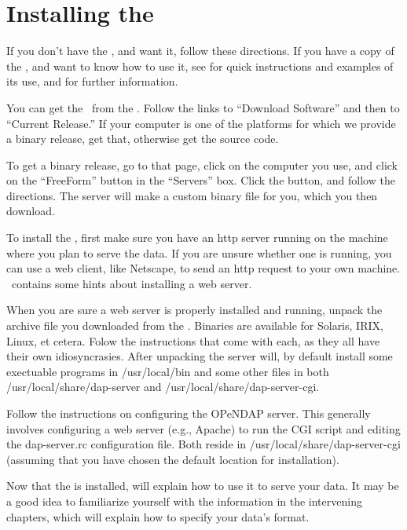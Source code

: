 \section{Installing the \ffs}
\label{ff,install-dods}

If you don't have the \ffs , and want it, follow these directions.  If
you have a copy of the \ffs , and want to know how to use it, see
 for quick instructions and examples of its use, and
 for further information.

You can get the \ffs\ from the \DODShome . Follow the links to
``Download Software'' and then to ``Current Release.''  If your
computer is one of the platforms for which we provide a binary release,
get that, otherwise get the source code.

To get a binary release, go to that page, click on the computer you
use, and click on the ``FreeForm'' button in the ``Servers'' box.
Click the  button, and follow the directions.  The
server will make a custom binary file for you, which you then
download.

To install the \ffs , first make sure you have an http server running
on the machine where you plan to serve the data.  If you are unsure
whether one is running, you can use a web client, like Netscape, to
send an http request to your own machine.  \DODSuser\ contains some
hints about installing a web server.

When you are sure a web server is properly installed and running,
unpack the archive file you downloaded from the \DODShome . Binaries
are available for Solaris, IRIX, Linux, et cetera. Folow the
instructions that come with each, as they all have their own
idiosyncrasies. After unpacking the server will, by default install
some exectuable programs in /usr/local/bin and some other files in
both /usr/local/share/dap-server and /usr/local/share/dap-server-cgi.

Follow the instructions on configuring the OPeNDAP server. This
generally involves configuring a web server (e.g., Apache) to run the
 CGI script and editing the dap-server.rc configuration
file. Both reside in /usr/local/share/dap-server-cgi (assuming that
you have chosen the default location for installation).

Now that the \ffs is installed,  will explain
how to use it to serve your data.  It may be a good idea to
familiarize yourself with the information in the intervening chapters,
which will explain how to specify your data's format.

